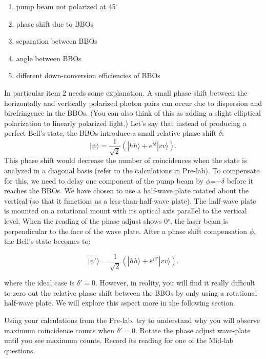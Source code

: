 \documentclass{../lab}
\begin{document}
\begin{enumerate}
    \item pump beam not polarized at 45$^\circ$

    \item phase shift due to BBOs

    \item separation between BBOs

    \item angle between BBOs

    \item different down-conversion efficiencies of BBOs
\end{enumerate}
In particular item 2 needs some explanation. A small phase shift between the horizontally and vertically polarized photon pairs can occur due to dispersion and birefringence in the BBOs. (You can also think of this as adding a slight elliptical polarization to linearly polarized light.) Let's say that instead of producing a perfect Bell's state, the BBOs introduce a small relative phase shift $\delta$:
\begin{equation}
    |\psi\rangle = \frac{1}{\sqrt{2}} (|hh\rangle + e^{i\delta} |vv\rangle).
\end{equation}
This phase shift would decrease the number of coincidences when the state is analyzed in a diagonal basis (refer to the calculations in Pre-lab). To compensate for this, we need to delay one component of the pump beam by $\phi$=$-\delta$ before it reaches the BBOs. %
We have chosen to use a half-wave plate rotated about the vertical (so that it functions as a less-than-half-wave plate). The half-wave plate is mounted on a rotational mount with its optical axis parallel to the vertical level. When the reading of the phase adjust shows 0$^\circ$, the laser beam is perpendicular to the face of the wave plate. After a phase shift compensation $\phi$, the Bell's state becomes to:

\begin{equation}
    |\psi'\rangle = \frac{1}{\sqrt{2}} (|hh\rangle + e^{i\delta'} |vv\rangle).
\end{equation}

where the ideal case is $\delta' = 0$. However, in reality, you will find it really difficult to zero out the relative phase shift between the BBOs by only using a rotational half-wave plate. We will explore this aspect more in the following section.

Using your calculations from the Pre-lab, try to understand why you will observe maximum coincidence counts when $\delta' = 0$. Rotate the phase adjust wave-plate until you see maximum counts. Record its reading for one of the Mid-lab questions.
\end{document}
